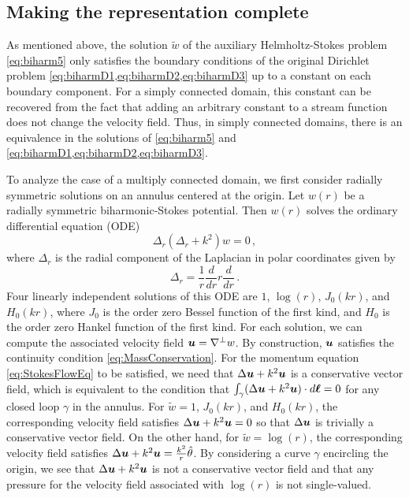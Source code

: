 \subsection{Making the representation complete}
As mentioned above, the solution $\tilde{w}$ of 
the auxiliary Helmholtz-Stokes problem \cref{eq:biharm5}
only satisfies the boundary conditions of the 
original Dirichlet problem \cref{eq:biharmD1,eq:biharmD2,eq:biharmD3}
up to a constant on each boundary component. For a simply
connected domain, this constant can be recovered from the
fact that adding an arbitrary constant to a stream function
does not change the velocity field. 
Thus, in simply connected domains, there is an equivalence in the 
solutions of \cref{eq:biharm5} and \cref{eq:biharmD1,eq:biharmD2,eq:biharmD3}.

To analyze the case of a multiply connected domain,
we first consider
radially symmetric solutions on an annulus centered at the
origin. Let $w\left(r\right)$ be a 
radially symmetric biharmonic-Stokes
potential. Then $w(r)$ solves the ordinary differential
equation (ODE)
\begin{equation}
\Delta_{r} (\Delta_{r} + k^2)w = 0 \, ,
\end{equation}
where $\Delta_{r}$ is the radial component of the Laplacian in polar
coordinates given by
$$
\Delta_{r} = \frac{1}{r}\frac{d}{dr} r \frac{d}{dr} \, .
$$
Four linearly independent solutions of this ODE are $1$, $\log{(r)}$, 
$J_{0}(kr)$, and $H_{0}(kr)$, 
where $J_{0}$ is the order zero Bessel function of the first kind, and $H_{0}$ is the order zero Hankel function of the first kind.
For each solution, we can compute the associated velocity field 
${\boldsymbol u} = \nabla^{\perp} w$. By construction, ${\boldsymbol u}$ satisfies 
the continuity condition \cref{eq:MassConservation}. 
For the momentum equation \cref{eq:StokesFlowEq} to be 
satisfied, we need that $\Delta{\boldsymbol u} + k^2 {\boldsymbol u}$ is a conservative
vector field, which 
is equivalent to the condition that 
$\int_{\gamma} (\Delta{\boldsymbol u} + k^2 {\boldsymbol u}) \cdot d{\boldsymbol \ell} = 0$ 
for any closed 
loop $\gamma$ in the annulus. For $\tilde{w}=1$, $J_{0}(kr)$, and $H_{0}(kr)$,
the corresponding velocity field satisfies
$\Delta {\boldsymbol u} + k^2 {\boldsymbol u}=0$ so that $\Delta {\boldsymbol u}$
is trivially a conservative vector field. 
On the other hand, for $\tilde{w}=\log{(r)}$, the corresponding velocity field
satisfies $\Delta {\boldsymbol u} + k^2 {\boldsymbol u}=\frac{k^2}{r} \hat{\theta}$.
By considering a curve $\gamma$ encircling the origin,
we see that $\Delta {\boldsymbol u} + k^2 {\boldsymbol u}$ is not a conservative vector
field and that any pressure for the velocity field 
associated with $\log\left(r\right)$ is not single-valued.
